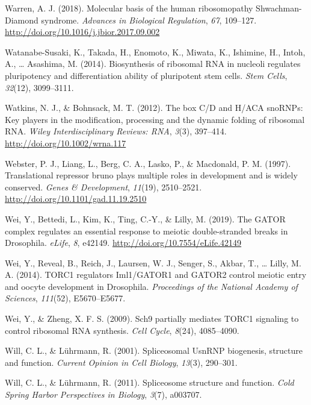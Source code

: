 \documentclass[12pt,twoside]{reedthesis}
\newlength{\cslhangindent}
\newenvironment{cslreferences}%
  {\setlength{\parindent}{0pt}%
  \everypar{\setlength{\hangindent}{\cslhangindent}}\ignorespaces}%
  {\par}
\begin{document}
\begin{cslreferences}
\leavevmode\hypertarget{ref-warrenMolecularBasisHuman2018}{}%
Warren, A. J. (2018). Molecular basis of the human ribosomopathy Shwachman-Diamond syndrome. \emph{Advances in Biological Regulation}, \emph{67}, 109--127. \url{http://doi.org/10.1016/j.jbior.2017.09.002}

\leavevmode\hypertarget{ref-WatanabeSusaki2014a}{}%
Watanabe-Susaki, K., Takada, H., Enomoto, K., Miwata, K., Ishimine, H., Intoh, A., \ldots{} Asashima, M. (2014). Biosynthesis of ribosomal RNA in nucleoli regulates pluripotency and differentiation ability of pluripotent stem cells. \emph{Stem Cells}, \emph{32}(12), 3099--3111.

\leavevmode\hypertarget{ref-Watkins2012b}{}%
Watkins, N. J., \& Bohnsack, M. T. (2012). The box C/D and H/ACA snoRNPs: Key players in the modification, processing and the dynamic folding of ribosomal RNA. \emph{Wiley Interdisciplinary Reviews: RNA}, \emph{3}(3), 397--414. \url{http://doi.org/10.1002/wrna.117}

\leavevmode\hypertarget{ref-Webster1997a}{}%
Webster, P. J., Liang, L., Berg, C. A., Lasko, P., \& Macdonald, P. M. (1997). Translational repressor bruno plays multiple roles in development and is widely conserved. \emph{Genes \& Development}, \emph{11}(19), 2510--2521. \url{http://doi.org/10.1101/gad.11.19.2510}

\leavevmode\hypertarget{ref-Wei2018a}{}%
Wei, Y., Bettedi, L., Kim, K., Ting, C.-Y., \& Lilly, M. (2019). The GATOR complex regulates an essential response to meiotic double-stranded breaks in Drosophila. \emph{eLife}, \emph{8}, e42149. \url{http://doi.org/10.7554/eLife.42149}

\leavevmode\hypertarget{ref-Wei2014b}{}%
Wei, Y., Reveal, B., Reich, J., Laursen, W. J., Senger, S., Akbar, T., \ldots{} Lilly, M. A. (2014). TORC1 regulators Iml1/GATOR1 and GATOR2 control meiotic entry and oocyte development in Drosophila. \emph{Proceedings of the National Academy of Sciences}, \emph{111}(52), E5670--E5677.

\leavevmode\hypertarget{ref-Wei2009a}{}%
Wei, Y., \& Zheng, X. F. S. (2009). Sch9 partially mediates TORC1 signaling to control ribosomal RNA synthesis. \emph{Cell Cycle}, \emph{8}(24), 4085--4090.

\leavevmode\hypertarget{ref-Will2001}{}%
Will, C. L., \& Lührmann, R. (2001). Spliceosomal UsnRNP biogenesis, structure and function. \emph{Current Opinion in Cell Biology}, \emph{13}(3), 290--301.

\leavevmode\hypertarget{ref-Will2011d}{}%
Will, C. L., \& Lührmann, R. (2011). Spliceosome structure and function. \emph{Cold Spring Harbor Perspectives in Biology}, \emph{3}(7), a003707.


\end{cslreferences}
\end{document}
